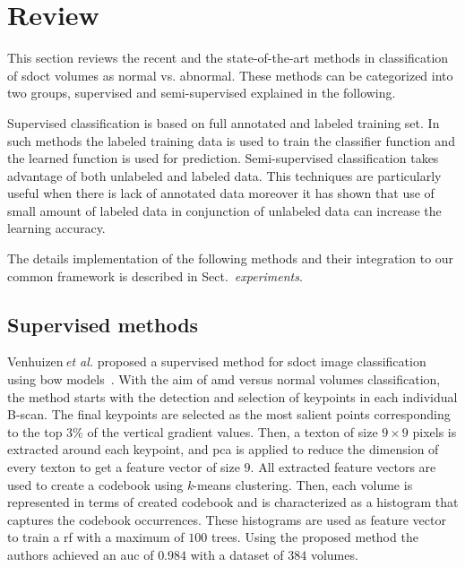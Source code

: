 \graphicspath{ {./content/method/figures/} }
\section{Review}
This section reviews the recent and the state-of-the-art methods in classification of \gls{sdoct} volumes as normal vs. abnormal.
These methods can be categorized into two groups, supervised and semi-supervised explained in the following. 

Supervised classification is based on full annotated and labeled training set. 
In such methods the labeled training data is used to train the classifier function and the learned function is used for prediction. 
Semi-supervised classification takes advantage of both unlabeled and labeled data. 
This techniques are particularly useful when there is lack of annotated data moreover it has shown that use of small amount of labeled data in conjunction of unlabeled data can increase the learning accuracy.

The details implementation of the following methods and their integration to our common framework is described in Sect.~\textit{experiments}. 
\subsection{Supervised methods}

Venhuizen\,\textit{et al.} proposed a supervised method for \gls{sdoct} image classification using \gls{bow} models~\cite{Venhuizen2015}. 
With the aim of \gls{amd} versus normal volumes classification, the method starts with the detection and selection of keypoints in each individual B-scan. %
The final keypoints are selected as the most salient points corresponding to the top $3 \%$ of the vertical gradient values. 
Then, a texton of size $9 \times 9$ pixels is extracted around each keypoint, and \gls{pca} is applied to reduce the dimension of every texton to get a feature vector of size $9$.
All extracted feature vectors are used to create a codebook using \textit{k}-means clustering.
Then, each volume is represented in terms of created codebook and is characterized as a histogram that captures the codebook occurrences.
These histograms are used as feature vector to train a \gls{rf} with a maximum of $100$ trees.
Using the proposed method the authors achieved an \gls{auc} of $0.984$ with a dataset of $384$ volumes. 

